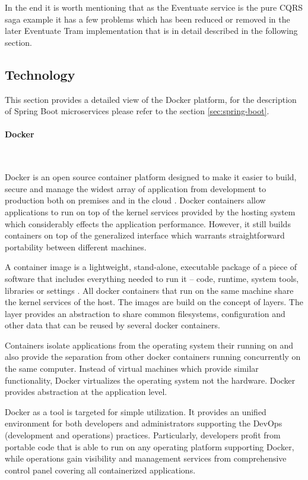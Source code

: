 \documentclass[oneside,
  digital, %
  table,   %
  nolof,     %
  nolot,     %
]{fithesis3}
\newcommand{\newlinepar}[1]{\paragraph{#1}\needspace{4\baselineskip}\mbox{}\\}
\begin{document}
\hfill \break

In the end it is worth mentioning that as the Eventuate service is the pure CQRS saga example it has a few problems which has been reduced or removed in the later Eventuate Tram implementation that is in detail described in the following section. 

\subsection{Technology}
\label{sec:eventuate-technology}

This section provides a detailed view of the Docker platform, for the description of Spring Boot microservices please refer to the section \ref{sec:spring-boot}.

\newlinepar{Docker}
\label{sec:docker}

Docker is an open source container platform designed to make it easier to build, secure and manage the widest array of application from development to production both on premises and in the cloud \cite{docker}. Docker containers allow applications to run on top of the kernel services provided by the hosting system which considerably effects the application performance. However, it still builds containers on top of the generalized interface which warrants straightforward portability between different machines.

A container image is a lightweight, stand-alone, executable package of a piece of software that includes everything needed to run it -- code, runtime, system tools, libraries or settings \cite{docker}. All docker containers that run on the same machine share the kernel services of the host. The images are build on the concept of layers. The layer provides an abstraction to share common filesystems, configuration and other data that can be reused by several docker containers.

Containers isolate applications from the operating system their running on and also provide the separation from other docker containers running concurrently on the same computer. Instead of virtual machines which provide similar functionality, Docker virtualizes the operating system not the hardware. Docker provides abstraction at the application level.

Docker as a tool is targeted for simple utilization. It provides an unified environment for both developers and administrators supporting the DevOps (development and operations) practices. Particularly, developers profit from portable code that is able to run on any operating platform supporting Docker, while operations gain visibility and management services from comprehensive control panel covering all containerized applications.
\end{document}
